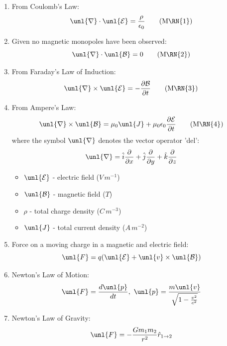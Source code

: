 \documentclass[a4paper, 11pt, normalem]{report}
\newcommand\p{\partial}
\newcommand\E{\mathcal{E}}
\newcommand\uE{\unl{\E}}
\newcommand\B{\mathcal{B}}
\newcommand\uB{\unl{\B}}
\newcommand\del{\unl{\nabla}}
\newcommand\eno{\epsilon_0}
\newcommand\hi{\hat{i}}
\newcommand\hj{\hat{j}}
\newcommand\hk{\hat{k}}
\newcommand\J{\unl{J}}
\begin{document}
\begin{enumerate}
    \item From Coulomb's Law:
        \begin{equation}
            \del\cdot\uE = \frac{\rho}{\eno} \tag{M\RN{1}}
        \end{equation}
    \item Given no magnetic monopoles have been observed:
        \begin{equation}
            \del\cdot \uB = 0 \tag{M\RN{2}}
        \end{equation}
    \item From Faraday's Law of Induction:
        \begin{equation}
            \del \times \uE = -\frac{\p \B}{\p t} \tag{M\RN{3}}
        \end{equation}
    \item From Ampere's Law:
        \begin{equation}
            \del \times \uB = \mu_0 \J + \mu_0 \eno \frac{\p \E}{\p t} \tag{M\RN{4}}
        \end{equation}
        where the symbol $\del$ denotes the vector operator 'del':
        \begin{equation*}
            \del = \hi \frac{\p}{\p x} + \hj \frac{\p}{\p y} + \hk \frac{\p}{\p z}
        \end{equation*}
        \begin{itemize}
            \item $\uE$ - electric field ($V\,m^{-1}$)
            \item $\uB$ - magnetic field ($T$)
            \item $\rho$ - total charge density ($C\,m^{-3}$)
            \item $\J$ - total current density ($A\,m^{-2}$)
        \end{itemize}
    \item Force on a moving charge in a magnetic and electric field:
        \begin{equation*}
            \unl{F} = q(\uE + \unl{v} \times \uB)
        \end{equation*}
    \item Newton's Law of Motion:
        \begin{equation*}
            \unl{F} = \frac{d\unl{p}}{dt}, ~ \unl{p} = \frac{m\unl{v}}{\sqrt{1 - \frac{v^2}{c^2}}}
        \end{equation*}
    \item Newton's Law of Gravity:
        \begin{equation*}
            \unl{F} = -\frac{Gm_1 m_2}{r^2}\hat{r}_{1 \to 2}
        \end{equation*}
\end{enumerate}
\end{document}
